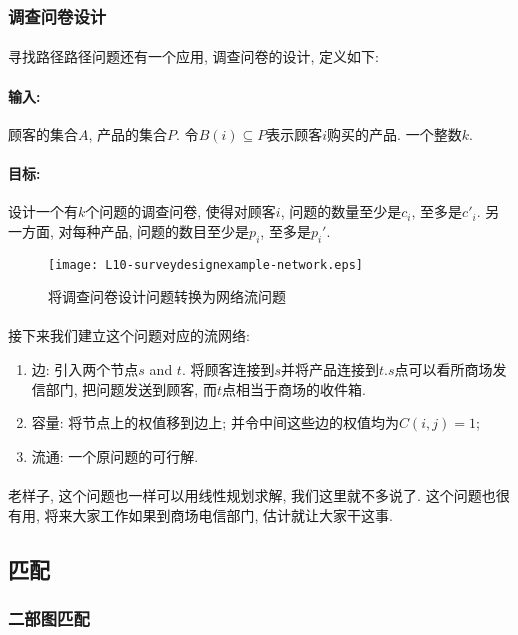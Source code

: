         \subsubsection{调查问卷设计}
            \paragraph{}寻找路径路径问题还有一个应用, 调查问卷的设计, 定义如下:
            \paragraph{输入:} 顾客的集合$A$, 产品的集合$P$. 令$B(i) \subseteq P$表示顾客$i$购买的产品. 一个整数$k$.
            \paragraph{目标:} 设计一个有$k$个问题的调查问卷, 使得对顾客$i$, 问题的数量至少是$c_i$, 至多是$c'_i$. 另一方面, 对每种产品, 问题的数目至少是$p_i$, 至多是$p_i'$.
        \begin{figure}[h]
            \centering
            \texttt{[image: L10-surveydesignexample-network.eps]}
            \caption{将调查问卷设计问题转换为网络流问题}
            \label{Figure: survey_design_example_network}
        \end{figure}
        \paragraph{} 接下来我们建立这个问题对应的流网络:
        \begin{enumerate}
 \item 边: 引入两个节点$s$ and $t$. 将顾客连接到$s$并将产品连接到$t$.$s$点可以看所商场发信部门, 把问题发送到顾客, 而$t$点相当于商场的收件箱.
 \item 容量: 将节点上的权值移到边上; 并令中间这些边的权值均为$C(i,j)=1$;
 \item 流通: 一个原问题的可行解.
        \end{enumerate}
        \paragraph{}老样子, 这个问题也一样可以用线性规划求解, 我们这里就不多说了. 这个问题也很有用, 将来大家工作如果到商场电信部门, 估计就让大家干这事.
    \subsection{匹配}
        \subsubsection{二部图匹配}
